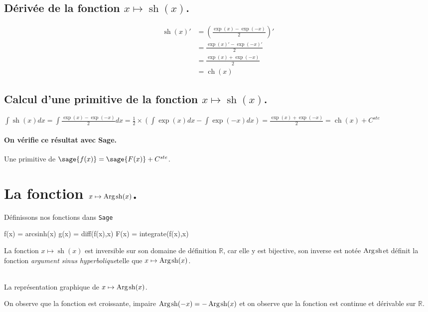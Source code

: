 \documentclass[a4paper,12pt]{report}
\def\eclaire{\mathbb}
\def\R{\ensuremath{\eclaire R}}
\renewcommand{\sinh}{\mathop{\mathrm{sh}}}
\renewcommand{\cosh}{\mathop{\mathrm{ch}}}
\renewcommand{\arg}{\mathop{\mathrm{Arg}}}
\begin{document}
\subsection{Dérivée de la fonction $x \mapsto \sinh(x)$.}
\begin{align*}
\sinh(x)' & = \left( \frac{\exp(x)-\exp(-x)}{2} \right)' \\ 
& = \frac{\exp(x)'-\exp(-x)'}{2} \\
& = \frac{\exp(x)+\exp(-x)}{2} \\
& = \cosh(x)
\end{align*}


\subsection{Calcul d'une primitive de la fonction  $x \mapsto \sinh(x)$.}
$\int \sinh(x) dx = \int \frac{\exp(x)- \exp(-x)}{2} dx = \frac{1}{2} \times \left( \int \exp(x) dx - \int \exp(-x) dx \right) = \frac{ \exp(x) + \exp(-x) }{2} = \cosh(x) + C^{ste}$
\paragraph{On vérifie ce résultat avec Sage.}
Une primitive de $\sage{f(x)} = \sage{F(x)} + C^{ste}$.




\section{La fonction  $x \mapsto \arg\mspace{-1mu}\sinh(x)$.}
Définissons nos fonctions dans {\texttt{Sage}}
\begin{sageblock}
    f(x) = arcsinh(x)
    g(x) = diff(f(x),x)
    F(x) = integrate(f(x),x)
\end{sageblock}


La fonction $x \mapsto \sinh(x)$ est inversible sur son domaine de définition $\R$, car elle y est bijective, son inverse est notée \og$ \arg\mspace{-1mu}\sinh $\fg et définit la fonction \og\emph{argument sinus hyperbolique}\fg telle que $x \mapsto \arg\mspace{-1mu}\sinh(x)$.


\begin{center}
 \\
La représentation graphique de $x \mapsto \arg\mspace{-1mu}\sinh(x)$.
\end{center}
On observe que la fonction est croissante, impaire $\arg\mspace{-1mu}\sinh(-x) = -\arg\mspace{-1mu}\sinh(x) $
et on observe que la fonction est continue et dérivable sur $\R$.                                                                                                             
\end{document}

